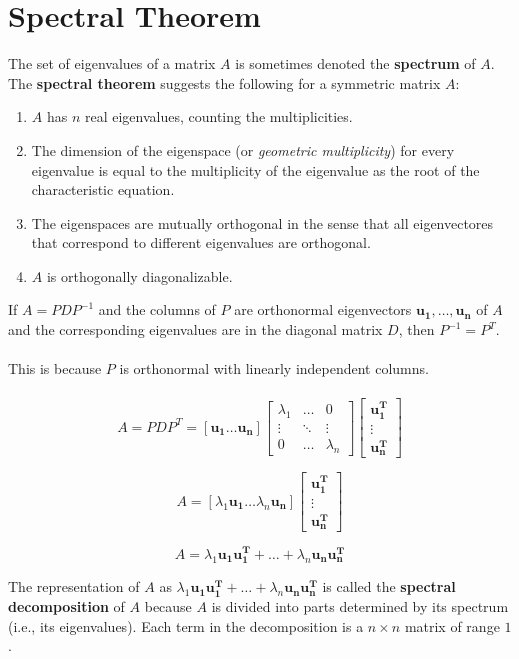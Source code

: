\documentclass[12pt]{article}
\newcommand{\bt}[1]{\textbf{{#1}}}
\newcommand{\bm}[1]{\mathbf{{#1}}}
\newcommand{\mb}{\begin{bmatrix}}
\newcommand{\me}{\end{bmatrix}}
\begin{document}
\section*{Spectral Theorem}

The set of eigenvalues of a matrix $A$ is sometimes denoted the \bt{spectrum}
of $A$. The \bt{spectral theorem} suggests the following for a symmetric matrix $A$:

\begin{enumerate}
    \item $A$ has $n$ real eigenvalues, counting the multiplicities.
    \item The dimension of the eigenspace (or \emph{geometric multiplicity}) for every eigenvalue is equal
    to the multiplicity of the eigenvalue as the root of the characteristic equation.
    \item The eigenspaces are mutually orthogonal in the sense that all eigenvectores that correspond to different eigenvalues are orthogonal.
    \item $A$ is orthogonally diagonalizable.
\end{enumerate}

If $A = PDP^{-1}$ and the columns of $P$ are orthonormal eigenvectors
$\bm{u_1,\dots,u_n}$ of $A$ and the corresponding eigenvalues are in
the diagonal matrix $D$, then $P^{-1} = P^T$. \\ \\

This is because $P$ is orthonormal with linearly independent columns. \\ \\

$$A = PDP^T = [\bm{u_1 \dots u_n}] \mb \lambda_1 & \dots & 0 \\ \vdots & \ddots & \vdots \\ 0 & \dots & \lambda_n \me \mb \bm{u_1^T} \\ \vdots \\ \bm{u_n^T}\me$$

$$A = [\lambda_1 \bm{u_1} \dots \lambda_n \bm{u_n}] \mb \bm{u_1^T} \\ \vdots \\ \bm{u_n^T} \me$$

$$A = \lambda_1 \bm{u_1 u_1^T} + \dots + \lambda_n\bm{u_n u_n^T}$$

The representation of $A$ as $\lambda_1 \bm{u_1 u_1^T} + \dots + \lambda_n\bm{u_n u_n^T}$ is called the
\bt{spectral decomposition} of $A$ because $A$ is divided into parts determined
by its spectrum (i.e., its eigenvalues). Each term in the decomposition is a
$n \times n$ matrix of range $1$. \\ \\
\end{document}
